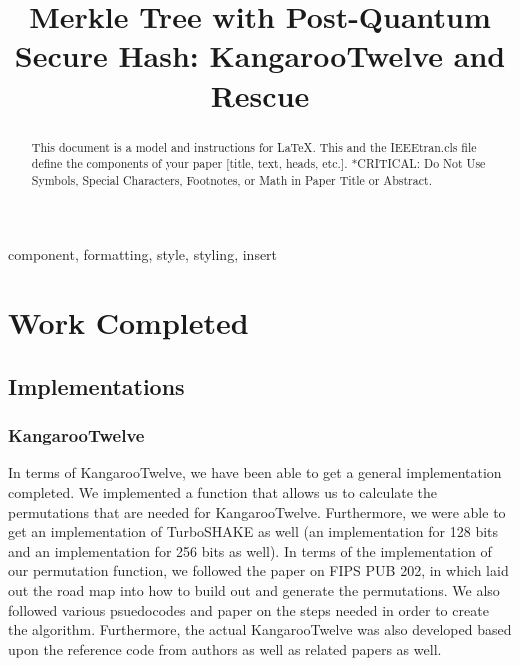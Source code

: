 \documentclass[conference]{IEEEtran}
\begin{document}
\title{Merkle Tree with Post-Quantum Secure Hash: KangarooTwelve and Rescue
\\
}

\author{
\and
{}
}

\maketitle

\begin{abstract}
This document is a model and instructions for \LaTeX.
This and the IEEEtran.cls file define the components of your paper [title, text, heads, etc.]. *CRITICAL: Do Not Use Symbols, Special Characters, Footnotes, 
or Math in Paper Title or Abstract.
\end{abstract}

\begin{IEEEkeywords}
component, formatting, style, styling, insert
\end{IEEEkeywords}

\section{Work Completed}

\subsection{Implementations}

\subsubsection{KangarooTwelve} 

In terms of KangarooTwelve, we have been able to get a general implementation completed. We implemented a function that allows us to calculate the permutations that are needed for KangarooTwelve. Furthermore, we were able to get an implementation of TurboSHAKE as well (an implementation for 128 bits and an implementation for 256 bits as well). In terms of the implementation of our permutation function, we followed the paper on FIPS PUB 202, in which laid out the road map into how to build out and generate the permutations. We also followed various psuedocodes and paper on the steps needed in order to create the algorithm. Furthermore, the actual KangarooTwelve was also developed based upon the reference code from authors as well as related papers as well.
\end{document}
